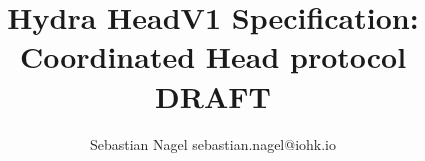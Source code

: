 \documentclass[11pt]{article}
\begin{document}
\title{\Large \textbf{Hydra HeadV1 Specification: Coordinated Head protocol}\\[2ex] DRAFT}
\author{Sebastian Nagel sebastian.nagel@iohk.io}

\maketitle









\clearpage


\clearpage


\end{document}

